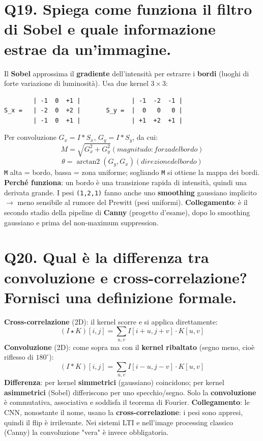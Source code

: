 \documentclass[11pt,a4paper]{article}
\begin{document}
\section*{Q19. Spiega come funziona il filtro di Sobel e quale informazione estrae da un'immagine.}
Il \textbf{Sobel} approssima il \textbf{gradiente} dell'intensità per estrarre i \textbf{bordi} (luoghi di forte variazione di luminosità). Usa due kernel $3\times 3$:
\begin{verbatim}
        | -1  0  +1 |              | -1  -2  -1 |
S_x =   | -2  0  +2 |       S_y =  |  0   0   0 |
        | -1  0  +1 |              | +1  +2  +1 |
\end{verbatim}
Per convoluzione $G_x = I*S_x$, $G_y = I*S_y$, da cui:
\[ M = \sqrt{G_x^{2} + G_y^{2}}        (magnitudo: forza del bordo) \]
\[ \theta  = \operatorname{arctan2}(G_y, G_x)        (direzione del bordo) \]
\texttt{M} alta = bordo, bassa = zona uniforme; sogliando \texttt{M} si ottiene la mappa dei bordi.
\textbf{Perché funziona}: un bordo è una transizione rapida di intensità, quindi una derivata grande. I pesi \texttt{(1,2,1)} fanno anche uno \textbf{smoothing} gaussiano implicito $\to $ meno sensibile al rumore del Prewitt (pesi uniformi).
\textbf{Collegamento}: è il secondo stadio della pipeline di \textbf{Canny} (progetto d'esame), dopo lo smoothing gaussiano e prima del non-maximum suppression.
\newpage
\section*{Q20. Qual è la differenza tra convoluzione e cross-correlazione? Fornisci una definizione formale.}
\textbf{Cross-correlazione} (2D): il kernel scorre e si applica direttamente:
\[ (I \star  K)[i,j] = \sum _{u,v} I[i+u, j+v] \cdot  K[u,v] \]
\textbf{Convoluzione} (2D): come sopra ma con il \textbf{kernel ribaltato} (segno meno, cioè riflesso di $180^{\circ}$):
\[ (I * K)[i,j] = \sum _{u,v} I[i-u, j-v] \cdot  K[u,v] \]
\textbf{Differenza}: per kernel \textbf{simmetrici} (gaussiano) coincidono; per kernel \textbf{asimmetrici} (Sobel) differiscono per uno specchio/segno. Solo la \textbf{convoluzione} è commutativa, associativa e soddisfa il teorema di Fourier.
\textbf{Collegamento}: le CNN, nonostante il nome, usano la \textbf{cross-correlazione}: i pesi sono appresi, quindi il flip è irrilevante. Nei sistemi LTI e nell'image processing classico (Canny) la convoluzione "vera" è invece obbligatoria.
\newpage
\end{document}
